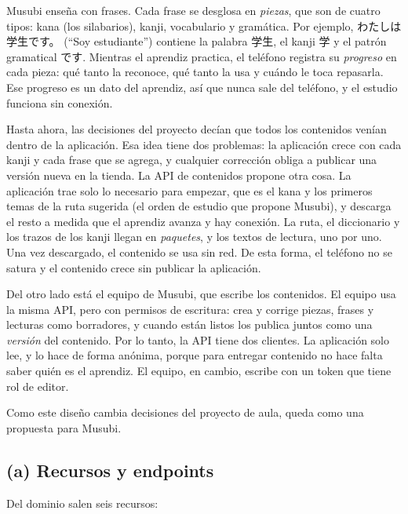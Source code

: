 \documentclass[11pt]{article}
\begin{document}
Musubi enseña con frases. Cada frase se desglosa en \emph{piezas}, que son de cuatro tipos: kana (los silabarios), kanji, vocabulario y gramática. Por ejemplo, わたしは学生です。 (``Soy estudiante'') contiene la palabra 学生, el kanji 学 y el patrón gramatical です. Mientras el aprendiz practica, el teléfono registra su \emph{progreso} en cada pieza: qué tanto la reconoce, qué tanto la usa y cuándo le toca repasarla. Ese progreso es un dato del aprendiz, así que nunca sale del teléfono, y el estudio funciona sin conexión.

Hasta ahora, las decisiones del proyecto decían que todos los contenidos venían dentro de la aplicación. Esa idea tiene dos problemas: la aplicación crece con cada kanji y cada frase que se agrega, y cualquier corrección obliga a publicar una versión nueva en la tienda. La API de contenidos propone otra cosa. La aplicación trae solo lo necesario para empezar, que es el kana y los primeros temas de la ruta sugerida (el orden de estudio que propone Musubi), y descarga el resto a medida que el aprendiz avanza y hay conexión. La ruta, el diccionario y los trazos de los kanji llegan en \emph{paquetes}, y los textos de lectura, uno por uno. Una vez descargado, el contenido se usa sin red. De esta forma, el teléfono no se satura y el contenido crece sin publicar la aplicación.

Del otro lado está el equipo de Musubi, que escribe los contenidos. El equipo usa la misma API, pero con permisos de escritura: crea y corrige piezas, frases y lecturas como borradores, y cuando están listos los publica juntos como una \emph{versión} del contenido. Por lo tanto, la API tiene dos clientes. La aplicación solo lee, y lo hace de forma anónima, porque para entregar contenido no hace falta saber quién es el aprendiz. El equipo, en cambio, escribe con un token que tiene rol de editor.

Como este diseño cambia decisiones del proyecto de aula, queda como una propuesta para Musubi.

\subsection*{(a) Recursos y endpoints}

Del dominio salen seis recursos:
\end{document}

